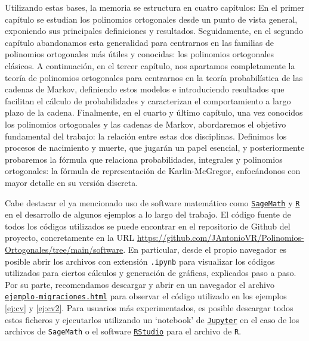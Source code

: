 Utilizando estas bases, la memoria se estructura en cuatro capítulos: En el primer capítulo se estudian los polinomios ortogonales desde un punto de vista general, exponiendo sus principales definiciones y resultados. Seguidamente, en el segundo capítulo abandonamos esta generalidad para centrarnos en las familias de polinomios ortogonales más útiles y conocidas: los polinomios ortogonales clásicos. A continuación, en el tercer capítulo, nos apartamos completamente la teoría de polinomios ortogonales para centrarnos en la teoría probabilística de las cadenas de Markov, definiendo estos modelos e introduciendo resultados que facilitan el cálculo de probabilidades y caracterizan el comportamiento a largo plazo de la cadena. Finalmente, en el cuarto y último capítulo, una vez conocidos los polinomios ortogonales y las cadenas de Markov, abordaremos el objetivo fundamental del trabajo: la relación entre estas dos disciplinas. Definimos los procesos de nacimiento y muerte, que jugarán un papel esencial, y posteriormente probaremos la fórmula que relaciona probabilidades, integrales y polinomios ortogonales: la fórmula de representación de Karlin-McGregor, enfocándonos con mayor detalle en su versión discreta.

Cabe destacar el ya mencionado uso de software matemático como \href{https://www.sagemath.org/}{\texttt{SageMath}} y \href{https://www.r-project.org/}{\texttt{R}} en el desarrollo de algunos ejemplos a lo largo del trabajo. El código fuente de todos los códigos utilizados se puede encontrar en el repositorio de Github del proyecto, concretamente en la URL \url{https://github.com/JAntonioVR/Polinomios-Ortogonales/tree/main/software}. En particular, desde el propio navegador es posible abrir los archivos con extensión \texttt{.ipynb} para visualizar los códigos utilizados para ciertos cálculos y generación de gráficas, explicados paso a paso. Por su parte, recomendamos descargar y abrir en un navegador el archivo \href{https://github.com/JAntonioVR/Polinomios-Ortogonales/blob/main/software/ejemplo-migraciones.html}{\texttt{ejemplo-migraciones.html}} para observar el código utilizado en los ejemplos \ref{ej:cv} y \ref{ej:cv2}. Para usuarios más experimentados, es posible descargar todos estos ficheros y ejecutarlos utilizando un `notebook' de \href{https://jupyter.org/}{\texttt{Jupyter}} en el caso de los archivos de \texttt{SageMath} o el software \href{https://posit.co/download/rstudio-desktop/}{\texttt{RStudio}} para el archivo de \texttt{R}.

